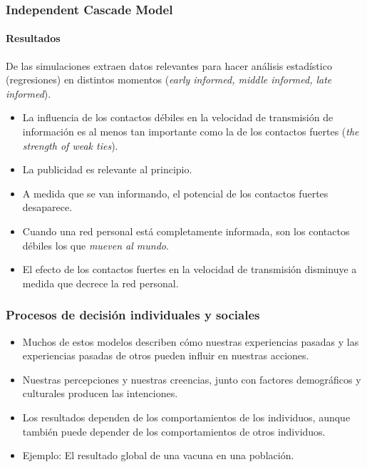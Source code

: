 \documentclass[11pt]{beamer}
\begin{document}
\begin{frame}
	\frametitle{Independent Cascade Model}
	\framesubtitle{Resultados}
	De las simulaciones extraen datos relevantes para hacer análisis estadístico (regresiones) en distintos momentos (\textit{early informed, middle informed, late informed}).
	\begin{itemize}
		\item La influencia de los contactos débiles en la velocidad de transmisión de información es al menos tan importante como la de los contactos fuertes (\textit{the strength of weak ties}).
		\item La publicidad es relevante al principio.
		\item A medida que se van informando, el potencial de los contactos fuertes desaparece.
		\item Cuando una red personal está completamente informada, son los contactos débiles los que \textit{mueven al mundo}.
		\item El efecto de los contactos fuertes en la velocidad de transmisión disminuye a medida que decrece la red personal.
	\end{itemize}
\end{frame}

\begin{frame}
	\frametitle{Procesos de decisión individuales y sociales}
	\begin{itemize}
		\item Muchos de estos modelos describen cómo nuestras experiencias pasadas y las experiencias pasadas de otros pueden influir en nuestras acciones.
		\item Nuestras percepciones y nuestras creencias, junto con factores demográficos y culturales producen las intenciones.
		\item Los resultados dependen de los comportamientos de los individuos, aunque también puede depender de los comportamientos de otros individuos. 
		\item Ejemplo: El resultado global de una vacuna en una población.
	\end{itemize}
\end{frame}

%	
\end{document}
